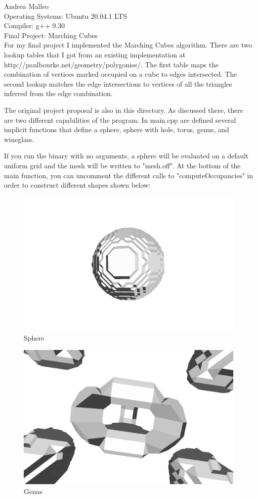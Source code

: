 \documentclass{article}
\begin{document}
Andrea Malleo \\
Operating Systems: Ubuntu 20.04.1 LTS \\
Compiler: g++ 9.30 \\

Final Project: Marching Cubes \\
For my final project I implemented the Marching Cubes algorithm. There are
two lookup tables that I got from an existing implementation at \\
 http://paulbourke.net/geometry/polygonise/.
The first table maps the combination of vertices marked occupied on a cube to edges intersected. The second lookup
matches the edge intersections to vertices of all the triangles inferred from the edge combination.

The original project proposal is also in this directory. As discussed there, there are two different capabilities of 
the program. In main.cpp are defined several implicit functions that define a sphere, sphere with hole, torus, genus, 
and wineglass. 

If you run the binary with no arguments, a sphere will be evaluated on a default uniform grid and 
the mesh will be written to "mesh.off". At the bottom of the main function, you can uncomment the different calls
to "computeOccupancies" in order to construct different shapes shown below:
\begin{figure}[h]
\includegraphics[scale=0.3]{implicitMeshes/sphere.png}
\caption{Sphere}
\end{figure}
\begin{figure}[h]
\includegraphics[scale=0.1]{implicitMeshes/genus.png}
\caption{Genus}
\end{figure}
\end{document}

